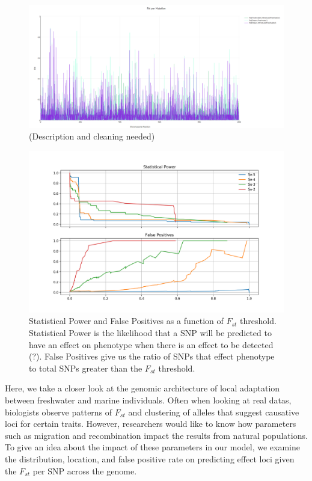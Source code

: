 \documentclass{article}
\begin{document}
\begin{figure}[h!tb]
	\begin{center}
  		\includegraphics[width=0.7\linewidth]{plotlyPlots/FstAcross5e-4.png}
  		\caption{(Description and cleaning needed)
		}
  		\label{fig:Fst2}
	\end{center}
\end{figure}

\begin{figure}
	\begin{center}
  		\includegraphics[width=0.7\linewidth]{matplotlibPlots/Power_FP.png}
  		\caption{ 
		Statistical Power and False Positives as a function of $F_{st}$ threshold. 
		Statistical Power is the likelihood that a SNP will be predicted to have an effect on phenotype when there is an effect to be detected (?).
		False Positives give us the ratio of SNPs that effect phenotype to total SNPs greater than the $F_{st}$ threshold.
		}
  		\label{fig:Power_FP}
	\end{center}
\end{figure}


%

Here, we take a closer look at the genomic architecture of local adaptation between freshwater and marine individuals. 
Often when looking at real datas, biologists observe patterns of $F_{st}$ and clustering of alleles that suggest causative loci for certain traits.
However, researchers would like to know how parameters such as migration and recombination impact the results from natural populations.
To give an idea about the impact of these parameters in our model, we examine the distribution, location, and false positive rate on predicting effect loci
given the $F_{st}$ per SNP across the genome. 
\end{document}
